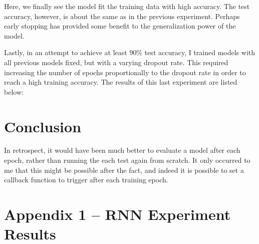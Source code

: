 \documentclass[letterpaper, 10pt]{article}
\begin{document}
Here, we finally see the model fit the training data with high accuracy.
The test accuracy, however, is about the same as in the previous experiment. Perhaps
early stopping has provided some benefit to the generalization power of the model.

Lastly, in an attempt to achieve at least 90\% test accuracy, I trained
models with all previous models fixed, but with a varying dropout rate.
This required increasing the number of epochs proportionally to the dropout rate
in order to reach a high training accuracy. The results of this last experiment
are listed below:


\section{Conclusion}

In retrospect, it would have been much better to evaluate a model after each epoch,
rather than running the each test again from scratch. It only occurred to me that this
might be possible after the fact, and indeed it is possible to set a callback
function to trigger after each training epoch.

\newpage

\section{Appendix 1 -- RNN Experiment Results}
\end{document}
